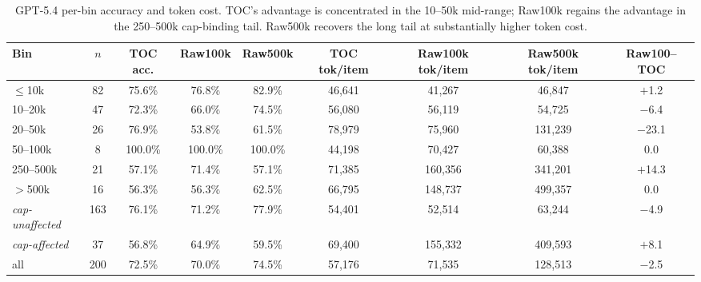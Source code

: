 \documentclass{article}
\begin{document}
\begin{table}[h]
\centering
\scriptsize
\setlength{\tabcolsep}{4pt}
\begin{tabular}{lcccccccc}
\toprule
Bin & $n$ & TOC acc. & Raw100k & Raw500k & TOC tok/item & Raw100k tok/item & Raw500k tok/item & Raw100--TOC \\
\midrule
$\le$10k & 82 & 75.6\% & 76.8\% & 82.9\% & 46{,}641 & 41{,}267 & 46{,}847 & $+$1.2 \\
10--20k & 47 & 72.3\% & 66.0\% & 74.5\% & 56{,}080 & 56{,}119 & 54{,}725 & $-$6.4 \\
20--50k & 26 & 76.9\% & 53.8\% & 61.5\% & 78{,}979 & 75{,}960 & 131{,}239 & $-$23.1 \\
50--100k & 8 & 100.0\% & 100.0\% & 100.0\% & 44{,}198 & 70{,}427 & 60{,}388 & 0.0 \\
250--500k & 21 & 57.1\% & 71.4\% & 57.1\% & 71{,}385 & 160{,}356 & 341{,}201 & $+$14.3 \\
$>$500k & 16 & 56.3\% & 56.3\% & 62.5\% & 66{,}795 & 148{,}737 & 499{,}357 & 0.0 \\
\midrule
\textit{cap-unaffected} & 163 & 76.1\% & 71.2\% & 77.9\% & 54{,}401 & 52{,}514 & 63{,}244 & $-$4.9 \\
\textit{cap-affected} & 37 & 56.8\% & 64.9\% & 59.5\% & 69{,}400 & 155{,}332 & 409{,}593 & $+$8.1 \\
all & 200 & 72.5\% & 70.0\% & 74.5\% & 57{,}176 & 71{,}535 & 128{,}513 & $-$2.5 \\
\bottomrule
\end{tabular}
\caption{GPT-5.4 per-bin accuracy and token cost. TOC's advantage is concentrated in the 10--50k mid-range; Raw100k regains the advantage in the 250--500k cap-binding tail. Raw500k recovers the long tail at substantially higher token cost.}
\label{tab:appendix-bin-gpt54}
\end{table}
\end{document}
